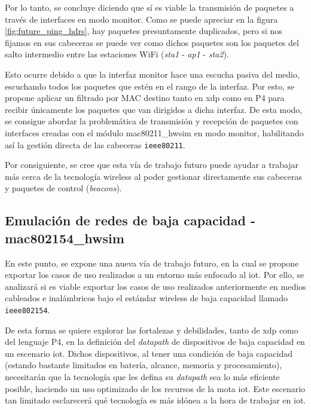 Por lo tanto, se concluye diciendo que sí es viable la transmisión de paquetes a través de interfaces en modo monitor. Como se puede apreciar en la figura \ref{fig:future_ping_hdrs}, hay paquetes presuntamente duplicados, pero si nos fijamos en sus cabeceras se puede ver como dichos paquetes son los paquetes del salto intermedio entre las estaciones WiFi (\textit{sta1} - \textit{ap1} - \textit{sta2}). \\

\par
Esto ocurre debido a que la interfaz monitor hace una escucha pasiva del medio, escuchando todos los paquetes que estén en el rango de la interfaz. Por esto, se propone aplicar un filtrado por MAC destino tanto en \gls{xdp} como en P4 para recibir únicamente los paquetes que van dirigidos a dicha interfaz. De esta modo, se consigue abordar la problemática de transmisión y recepción de paquetes con interfaces creadas con el módulo mac80211\_hwsim en modo monitor, habilitando así la gestión directa de las cabeceras \texttt{ieee80211}.\\
\par

Por consiguiente, se cree que esta vía de trabajo futuro puede ayudar a trabajar más cerca de la tecnología wireless al poder gestionar directamente sus cabeceras y paquetes de control (\textit{beacons}). 

\newpage
\subsection{Emulación de redes de baja capacidad - mac802154\_hwsim}

En este punto, se expone una nueva vía de trabajo futuro, en la cual se propone exportar los casos de uso realizados a un entorno más enfocado al \gls{iot}. Por ello, se analizará si es viable exportar los casos de uso realizados anteriormente en medios cableados e inalámbricos bajo el estándar wireless de baja capacidad llamado \texttt{ieee802154}. \\
\par
De esta forma se quiere explorar las fortalezas y debilidades, tanto de \gls{xdp} como del lenguaje P4, en la definición del \textit{datapath} de dispositivos de baja capacidad en un escenario \gls{iot}. Dichos dispositivos, al tener una condición de baja capacidad (estando bastante limitados en batería, alcance, memoria y procesamiento), necesitarán que la tecnología que les defina su \textit{datapath} sea lo más eficiente posible, haciendo un uso optimizado de los recursos de la mota \gls{iot}. Este escenario tan limitado esclarecerá qué tecnología es más idónea a la hora de trabajar en \gls{iot}.

